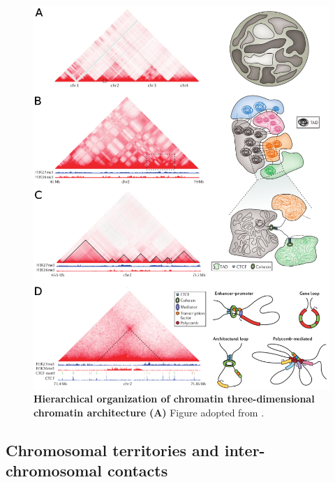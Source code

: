 \documentclass[a4paper,twoside=true,openright,parskip=full,chapterprefix=true,11pt,headings=normal,bibliography=totoc,listof=totoc,titlepage=on,captions=tableabove,draft=false]{scrreprt}
\theoremstyle{definition}
\theoremstyle{definition}
\theoremstyle{definition}
\theoremstyle{remark}
\begin{document}
\begin{figure}

{\centering \includegraphics[width=1\linewidth]{figures/Bonev2016Fig2_reordered} 

}

\caption{\textbf{Hierarchical organization of chromatin
three-dimensional chromatin architecture} \textbf{(A)} Figure adopted
from \citep{Bonev2016}.}\label{fig:GenomeHierarchy}
\end{figure}





\hypertarget{chromosomal-territories-and-inter-chromosomal-contacts}{%
\subsection{Chromosomal territories and inter-chromosomal
contacts}\label{chromosomal-territories-and-inter-chromosomal-contacts}}
\end{document}
